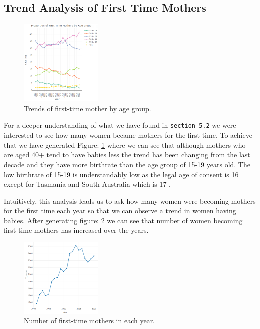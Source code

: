 \subsection{Trend Analysis of First Time Mothers}

\begin{figure}
  \centering
  \includegraphics[width=0.35\textwidth]{img/first_time_age_group.png}
  \caption{Trends of first-time mother by age group.}
  \label{fig:age2}
\end{figure}
For a deeper understanding of what we have found in \verb|section 5.2| we were interested to see how many women became mothers for the first time. To achieve that we have generated Figure: \ref{fig:age2} where we can see that although mothers who are aged 40+ tend to have babies less the trend has been changing from the last decade and they have more birthrate than the age group of 15-19 years old. The low birthrate of 15-19 is understandably low as the legal age of consent is 16 except for Tasmania and South Australia which is 17 \cite{consentWebsite}.

Intuitively, this analysis leads us to ask how many women were becoming mothers for the first time each year so that we can observe a trend in women having babies. After generating figure: \ref{fig:firstTime} we can see that number of women becoming first-time mothers has increased over the years.


\begin{figure}
  \centering
  \includegraphics[width=0.35\textwidth]{img/first_time.png}
  \caption{Number of first-time mothers in each year.}
  \label{fig:firstTime}
\end{figure}